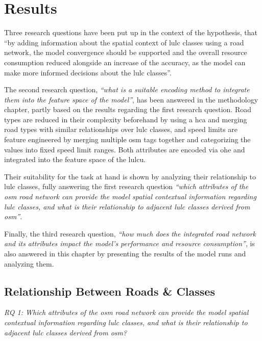 \chapter{Results}
\label{sec:results}

Three research questions have been put up in the context of the hypothesis, that \enquote{by adding information about the spatial context of \gls{lulc} classes using a road network, the model convergence should be supported and the overall resource consumption reduced alongside an increase of the accuracy, as the model can make more informed decisions about the \gls{lulc} classes}.

The second research question, \emph{\enquote{what is a suitable encoding method to integrate them into the feature space of the model}}, has been answered in the methodology chapter, partly based on the results regarding the first research question. Road types are reduced in their complexity beforehand by using a \gls{hca} and merging road types with similar relationships over \gls{lulc} classes, and speed limits are feature engineered by merging multiple \gls{osm} tags together and categorizing the values into fixed speed limit ranges. Both attributes are encoded via \gls{ohe} and integrated into the feature space of the \gls{lulcu}.

Their suitability for the task at hand is shown by analyzing their relationship to \gls{lulc} classes, fully answering the first research question \emph{\enquote{which attributes of the \gls{osm} road network can provide the model spatial contextual information regarding \gls{lulc} classes, and what is their relationship to adjacent \gls{lulc} classes derived from \gls{osm}}}.

Finally, the third research question, \emph{\enquote{how much does the integrated road network and its attributes impact the model's performance and resource consumption}}, is also answered in this chapter by presenting the results of the model runs and analyzing them.

\section{Relationship Between Roads \&  Classes}

\emph{RQ 1: Which attributes of the \gls{osm} road network can provide the model spatial contextual information regarding \gls{lulc} classes, and what is their relationship to adjacent \gls{lulc} classes derived from \gls{osm}?}

